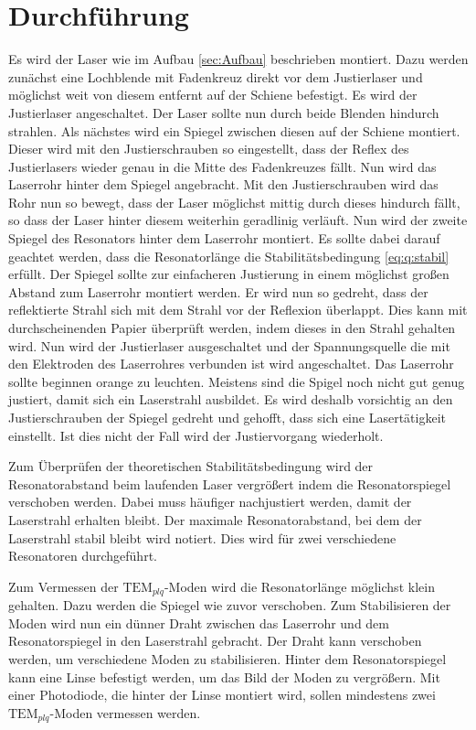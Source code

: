 
\section{Durchführung}
\label{sec:Durchführung}
Es wird der Laser wie im Aufbau \ref{sec:Aufbau} beschrieben montiert. Dazu werden zunächst eine Lochblende mit Fadenkreuz direkt vor dem Justierlaser und möglichst weit von diesem entfernt auf der Schiene befestigt. Es wird der Justierlaser angeschaltet. Der Laser sollte nun durch beide Blenden hindurch strahlen. Als nächstes wird ein Spiegel zwischen diesen auf der Schiene montiert. Dieser wird mit den Justierschrauben so eingestellt, dass der Reflex des Justierlasers wieder genau in die Mitte des Fadenkreuzes fällt. Nun wird das Laserrohr hinter dem Spiegel angebracht. Mit den Justierschrauben wird das Rohr nun so bewegt, dass der Laser möglichst mittig durch dieses hindurch fällt, so dass der Laser hinter diesem weiterhin geradlinig verläuft. Nun wird der zweite Spiegel des Resonators hinter dem Laserrohr montiert. Es sollte dabei darauf geachtet werden, dass die Resonatorlänge die Stabilitätsbedingung \eqref{eq:q:stabil} erfüllt. Der Spiegel sollte zur einfacheren Justierung in einem möglichst großen Abstand zum Laserrohr montiert werden. Er wird nun so gedreht, dass der reflektierte Strahl sich mit dem Strahl vor der Reflexion überlappt. Dies kann mit durchscheinenden Papier überprüft werden, indem dieses in den Strahl gehalten wird. Nun wird der Justierlaser ausgeschaltet und der Spannungsquelle die mit den Elektroden des Laserrohres verbunden ist wird angeschaltet. Das Laserrohr sollte beginnen orange zu leuchten. Meistens sind die Spigel noch nicht gut genug justiert, damit sich ein Laserstrahl ausbildet. Es wird deshalb vorsichtig an den Justierschrauben der Spiegel gedreht und gehofft, dass sich eine Lasertätigkeit einstellt. Ist dies nicht der Fall wird der Justiervorgang wiederholt. 

Zum Überprüfen der theoretischen Stabilitätsbedingung wird der Resonatorabstand beim laufenden Laser vergrößert indem die Resonatorspiegel verschoben werden. Dabei muss häufiger nachjustiert werden, damit der Laserstrahl erhalten bleibt. Der maximale Resonatorabstand, bei dem der Laserstrahl stabil bleibt wird notiert. Dies wird für zwei verschiedene Resonatoren durchgeführt.

Zum Vermessen der $\text{TEM}_{plq}$-Moden wird die Resonatorlänge möglichst klein gehalten. Dazu werden die Spiegel wie zuvor verschoben. Zum Stabilisieren der Moden wird nun ein dünner Draht zwischen das Laserrohr und dem Resonatorspiegel in den Laserstrahl gebracht. Der Draht kann verschoben werden, um verschiedene Moden zu stabilisieren. Hinter dem Resonatorspiegel kann eine Linse befestigt werden, um das Bild der Moden zu vergrößern. Mit einer Photodiode, die hinter der Linse montiert wird, sollen mindestens zwei $\text{TEM}_{plq}$-Moden vermessen werden.


